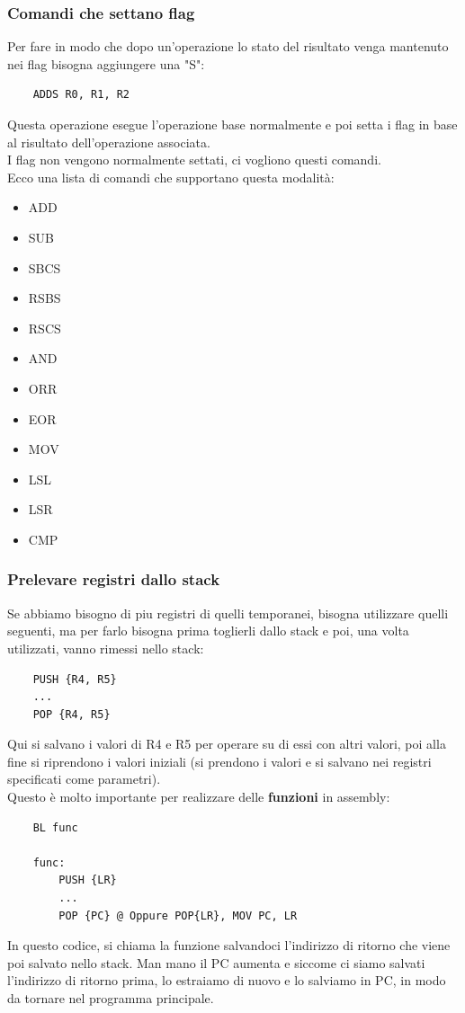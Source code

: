 \documentclass[12pt,a4paper]{article}
\begin{document}
\subsubsection{Comandi che settano flag}
Per fare in modo che dopo un'operazione lo stato del risultato venga mantenuto nei flag bisogna aggiungere una "S":
\begin{lstlisting}
    ADDS R0, R1, R2
\end{lstlisting}
Questa operazione esegue l'operazione base normalmente e poi setta i flag in base al risultato dell'operazione associata.\\
I flag non vengono normalmente settati, ci vogliono questi comandi.\\
Ecco una lista di comandi che supportano questa modalità:
\begin{itemize}
    \item ADD
    \item SUB
    \item SBCS
    \item RSBS
    \item RSCS
    \item AND
    \item ORR
    \item EOR
    \item MOV
    \item LSL
    \item LSR
    \item CMP
\end{itemize}

\subsubsection{Prelevare registri dallo stack}
Se abbiamo bisogno di piu registri di quelli temporanei, bisogna utilizzare quelli seguenti, ma per farlo bisogna prima toglierli dallo stack e poi, una volta utilizzati, vanno rimessi nello stack:
\begin{lstlisting}
    PUSH {R4, R5}
    ...
    POP {R4, R5}
\end{lstlisting}
Qui si salvano i valori di R4 e R5 per operare su di essi con altri valori, poi alla fine si riprendono i valori iniziali (si prendono i valori e si salvano nei registri specificati come parametri).\\
Questo è molto importante per realizzare delle \textbf{funzioni} in assembly:
\begin{lstlisting}
    BL func

    func:
        PUSH {LR}
        ...
        POP {PC} @ Oppure POP{LR}, MOV PC, LR

\end{lstlisting}
In questo codice, si chiama la funzione salvandoci l'indirizzo di ritorno che viene poi salvato nello stack. Man mano il PC aumenta e siccome ci siamo salvati l'indirizzo di ritorno prima, lo estraiamo di nuovo e lo salviamo in PC, in modo da tornare nel programma principale.
\end{document}
